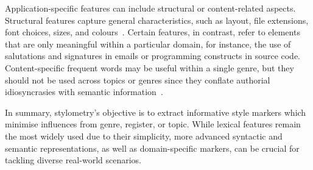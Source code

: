 Application-specific features can include structural or content-related aspects. 
Structural features capture general characteristics, such as layout, file extensions, font choices, sizes, and colours~\citep{abbasi_writeprints_2008,neal_surveying_2018}. 
Certain features, in contrast, refer to elements that are only meaningful within a particular domain, for instance, the use of salutations and signatures in emails or programming constructs in source code. 
Content-specific frequent words may be useful within a single genre, but they should not be used across topics or genres since they conflate authorial idiosyncrasies with semantic information~\citep{abbasi_writeprints_2008}.


In summary, stylometry's objective is to extract informative style markers which minimise influences from genre, register, or topic. 
While lexical features remain the most widely used due to their simplicity, more advanced syntactic and semantic representations, as well as domain-specific markers, can be crucial for tackling diverse real-world scenarios.

